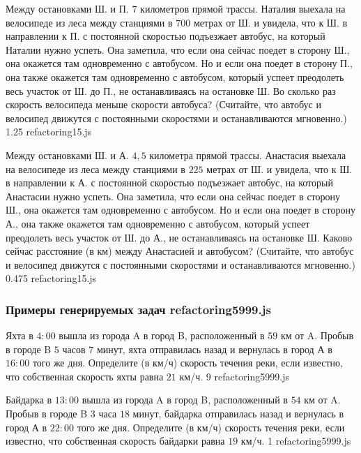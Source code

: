 \par{Между остановками Ш. и П. $7$ километров прямой трассы. Наталия выехала на велосипеде из леса между станциями в $700$ метрах от Ш. и увидела, что к Ш. в направлении к П. с постоянной скоростью подъезжает автобус, на который Наталии нужно успеть. Она заметила, что если она сейчас поедет в сторону Ш., она окажется там одновременно с автобусом. Но и если она поедет в сторону П., она также окажется там одновременно с автобусом, который успеет преодолеть весь участок от Ш. до П., не останавливаясь на остановке Ш. Во сколько раз скорость велосипеда меньше скорости автобуса? (Считайте, что автобус и велосипед движутся с постоянными скоростями и останавливаются мгновенно.) }{ 1.25 }{refactoring15.js}
\par{Между остановками Ш. и А. $4,5$ километра прямой трассы. Анастасия выехала на велосипеде из леса между станциями в $225$ метрах от Ш. и увидела, что к Ш. в направлении к А. с постоянной скоростью подъезжает автобус, на который Анастасии нужно успеть. Она заметила, что если она сейчас поедет в сторону Ш., она окажется там одновременно с автобусом. Но и если она поедет в сторону А., она также окажется там одновременно с автобусом, который успеет преодолеть весь участок от Ш. до А., не останавливаясь на остановке Ш. Каково сейчас расстояние (в км) между Анастасией и автобусом? (Считайте, что автобус и велосипед движутся с постоянными скоростями и останавливаются мгновенно.) }{ 0.475 }{refactoring15.js}


\subsubsection*{Примеры генерируемых задач refactoring5999.js}
 
\par{Яхта в $4:00$ вышла из города A в город B, расположенный в $59$ км от A. Пробыв в городе B $5$ часов $7$ минут, яхта отправилась назад и вернулась в город А в $16:00$ того же дня. Определите (в км/ч) скорость течения реки, если известно, что собственная скорость яхты равна $21$ км/ч. }{ 9 }{refactoring5999.js}
\par{Байдарка в $13:00$ вышла из города A в город B, расположенный в $54$ км от A. Пробыв в городе B $3$ часа $18$ минут, байдарка отправилась назад и вернулась в город А в $22:00$ того же дня. Определите (в км/ч) скорость течения реки, если известно, что собственная скорость байдарки равна $19$ км/ч. }{ 1 }{refactoring5999.js}

